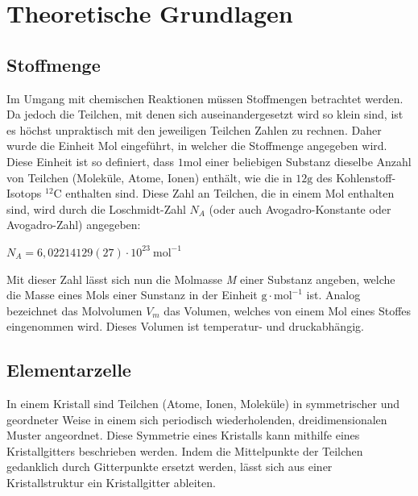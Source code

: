 \documentclass[12pt,a4paper,titlepage,headinclude,bibtotoc]{scrartcl}
\begin{document}
\newpage

\section{Theoretische Grundlagen}
\subsection{Stoffmenge}
Im Umgang mit chemischen Reaktionen müssen Stoffmengen betrachtet werden. Da jedoch die Teilchen, mit denen sich auseinandergesetzt wird so klein sind, ist es höchst unpraktisch mit den jeweiligen Teilchen Zahlen zu rechnen. Daher wurde die Einheit Mol eingeführt, in welcher die Stoffmenge angegeben wird. Diese Einheit ist so definiert, dass $ \mathrm{1 mol}$ einer beliebigen Substanz dieselbe Anzahl von Teilchen (Moleküle, Atome, Ionen) enthält, wie die in $\mathrm{12g}$ des Kohlenstoff-Isotops $\mathrm{^{12}C}$ enthalten sind. Diese Zahl an Teilchen, die in einem Mol enthalten sind, wird durch die Loschmidt-Zahl $N_{A}$ (oder auch Avogadro-Konstante oder Avogadro-Zahl) angegeben:\\

\begin{center}
$N_{A}=6,02214129(27)\cdot 10^{23}\ \mathrm{mol^{-1}}$ 
\end{center}

Mit dieser Zahl lässt sich nun die Molmasse \textit{M} einer Substanz angeben, welche die Masse eines Mols einer Sunstanz in der Einheit $ \mathrm{g \cdot mol^{-1}}$ ist. Analog bezeichnet das Molvolumen $V_{m}$ das Volumen, welches von einem Mol eines Stoffes eingenommen wird. Dieses Volumen ist temperatur- und druckabhängig.

\subsection{Elementarzelle}
In einem Kristall sind Teilchen (Atome, Ionen, Moleküle) in symmetrischer und geordneter Weise in einem sich periodisch wiederholenden, dreidimensionalen Muster angeordnet. Diese Symmetrie eines Kristalls kann mithilfe eines Kristallgitters beschrieben werden. Indem die Mittelpunkte der Teilchen gedanklich durch Gitterpunkte ersetzt werden, lässt sich aus einer Kristallstruktur ein Kristallgitter ableiten.\\
\end{document}
